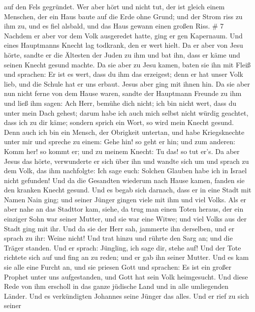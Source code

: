 auf den Fels gegründet.  Wer aber hört und nicht tut, der
ist gleich einem Menschen, der ein Haus baute auf die Erde ohne Grund;
und der Strom riss zu ihm zu, und es fiel alsbald, und das Haus gewann
einen großen Riss. \# 7  Nachdem er aber vor dem Volk
ausgeredet hatte, ging er gen Kapernaum.  Und eines
Hauptmanns Knecht lag todkrank, den er wert hielt.  Da er
aber von Jesu hörte, sandte er die Ältesten der Juden zu ihm und bat
ihn, dass er käme und seinen Knecht gesund machte.  Da sie
aber zu Jesu kamen, baten sie ihn mit Fleiß und sprachen: Er ist es
wert, dass du ihm das erzeigest;  denn er hat unser Volk
lieb, und die Schule hat er uns erbaut.  Jesus aber ging mit
ihnen hin. Da sie aber nun nicht ferne von dem Hause waren, sandte der
Hauptmann Freunde zu ihm und ließ ihm sagen: Ach Herr, bemühe dich
nicht; ich bin nicht wert, dass du unter mein Dach gehest; 
darum habe ich auch mich selbst nicht würdig geachtet, dass ich zu dir
käme; sondern sprich ein Wort, so wird mein Knecht gesund. 
Denn auch ich bin ein Mensch, der Obrigkeit untertan, und habe
Kriegsknechte unter mir und spreche zu einem: Gehe hin! so geht er hin;
und zum anderen: Komm her! so kommt er; und zu meinem Knecht: Tu das! so
tut er's.  Da aber Jesus das hörte, verwunderte er sich über
ihn und wandte sich um und sprach zu dem Volk, das ihm nachfolgte: Ich
sage euch: Solchen Glauben habe ich in Israel nicht gefunden!
 Und da die Gesandten wiederum nach Hause kamen, fanden sie
den kranken Knecht gesund.  Und es begab sich darnach, dass
er in eine Stadt mit Namen Nain ging; und seiner Jünger gingen viele mit
ihm und viel Volks.  Als er aber nahe an das Stadttor kam,
siehe, da trug man einen Toten heraus, der ein einziger Sohn war seiner
Mutter, und sie war eine Witwe; und viel Volks aus der Stadt ging mit
ihr.  Und da sie der Herr sah, jammerte ihn derselben, und
er sprach zu ihr: Weine nicht!  Und trat hinzu und rührte
den Sarg an; und die Träger standen. Und er sprach: Jüngling, ich sage
dir, stehe auf!  Und der Tote richtete sich auf und fing an
zu reden; und er gab ihn seiner Mutter.  Und es kam sie
alle eine Furcht an, und sie priesen Gott und sprachen: Es ist ein
großer Prophet unter uns aufgestanden, und Gott hat sein Volk
heimgesucht.  Und diese Rede von ihm erscholl in das ganze
jüdische Land und in alle umliegenden Länder.  Und es
verkündigten Johannes seine Jünger das alles. Und er rief zu sich seiner
